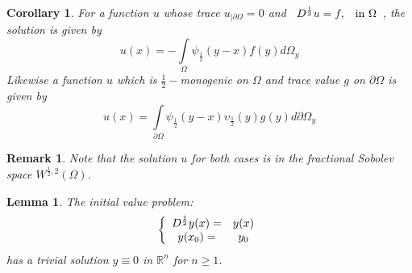 \documentclass{amsart}%
\providecommand{\U}[1]{\protect\rule{.1in}{.1in}}
\theoremstyle{plain}
\newtheorem{corollary}{Corollary}
\newtheorem{lemma}{Lemma}
\newtheorem{remark}{Remark}
\numberwithin{equation}{section}
\begin{document}
\begin{corollary}
For a function $u$ whose trace $u_{\mid\partial\Omega}=0$ and $%
\begin{array}
[c]{cc}%
D^{\frac{1}{2}}u=f, & \text{in }\Omega
\end{array}
$, the solution is given by
\[
u\left(  x\right)  =-%
{\displaystyle\int\limits_{\Omega}}
\psi_{\frac{1}{2}}\left(  y-x\right)  f(y)d\Omega_{y}%
\]
Likewise a function $u$ which is $\frac{1}{2}-$monogenic on $\Omega$ and trace
value $g$ on $\partial\Omega$ is given by
\[
u(x)=%
{\displaystyle\int\limits_{\partial\Omega}}
\psi_{\frac{1}{2}}\left(  y-x\right)  \upsilon_{\frac{1}{2}}\left(  y\right)
g(y)d\partial\Omega_{y}%
\]

\end{corollary}

\begin{remark}
Note that the solution $u$ for both cases is in the fractional Sobolev space
$W^{\frac{1}{2},2}\left(  \Omega\right)  $.
\end{remark}

\begin{lemma}
The initial value problem:
\[
\left\{
\begin{array}
[c]{cc}%
D^{\frac{1}{2}}y(x)= & y(x)\\
y(x_{0})= & y_{0}%
\end{array}
\right.
\]
has a trivial solution $y\equiv0$ in $%
\mathbb{R}
^{n}$ for $n\geq1$.
\end{lemma}
\end{document}
